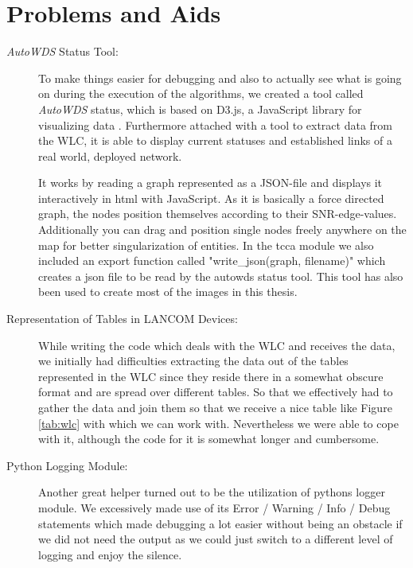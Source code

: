   \section{Problems and Aids}
    \begin{description}
    \item [\textit{AutoWDS} Status Tool:]
      To make things easier for debugging and also to actually see what is going on during the execution of the algorithms,
      we created a tool called \textit{AutoWDS} status, which is based on D3.js, a JavaScript library for visualizing data \cite{d3js}.
      Furthermore attached with a tool to extract data from the \ac{WLC}, it is able to display current statuses and established links of a real world, deployed network.
      
      It works by reading a graph represented as a \ac{JSON}-file and displays it interactively in html with JavaScript.
      As it is basically a force directed graph, the nodes position themselves according to their \ac{SNR}-edge-values. 
      Additionally you can drag and position single nodes freely anywhere on the map for better singularization of entities.
      In the tcca module we also included an export function called "write\_json(graph, filename)" which creates a json file to be read by the autowds status tool.
      This tool has also been used to create most of the images in this thesis.

    \item [Representation of Tables in LANCOM Devices:]
      While writing the code which deals with the \ac{WLC} and receives the data, 
      we initially had difficulties extracting the data out of the tables represented in the \ac{WLC} since
      they reside there in a somewhat obscure format and are spread over different tables.
      So that we effectively had to gather the data and join them so that we receive a nice table like Figure \ref{tab:wlc} with which we can work with. 
      Nevertheless we were able to cope with it, although the code for it is somewhat longer and cumbersome.

    \item [Python Logging Module:]
      Another great helper turned out to be the utilization of pythons logger module. 
      We excessively made use of its Error / Warning / Info / Debug statements which made debugging
      a lot easier without being an obstacle if we did not need the output as we could just switch to a different level of logging and enjoy the silence.
    

\end{description}
